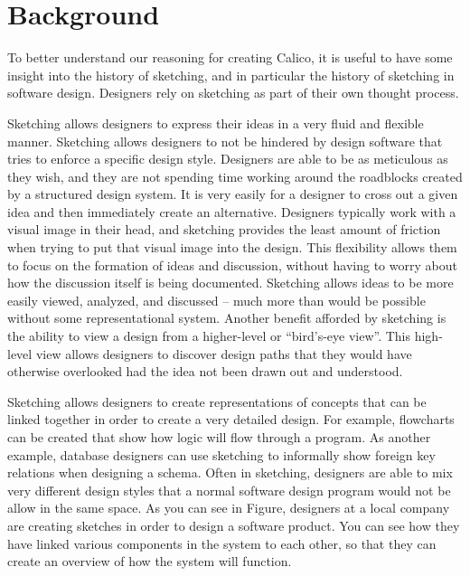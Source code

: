 \chapter{Background}

To better understand our reasoning for creating Calico, it is useful to have some insight into the history of sketching, and in particular the history of sketching in software design. Designers rely on sketching as part of their own thought process.

Sketching allows designers to express their ideas in a very fluid and flexible manner.
Sketching allows designers to not be hindered by design software that tries to enforce a specific design style. Designers are able to be as meticulous as they wish, and they are not spending time working around the roadblocks created by a structured design system.
It is very easily for a designer to cross out a given idea and then immediately create an alternative. Designers typically work with a visual image in their head\cite{todo}, and sketching provides the least amount of friction when trying to put that visual image into the design.
This flexibility allows them to focus on the formation of ideas and discussion, without having to worry about how the discussion itself is being documented. 
Sketching allows ideas to be more easily viewed, analyzed, and discussed -- much more than would be possible without some representational system.
Another benefit afforded by sketching is the ability to view a design from a higher-level or ``bird’s-eye view''.
This high-level view allows designers to discover design paths that they would have otherwise overlooked had the idea not been drawn out and understood. 

Sketching allows designers to create representations of concepts that can be linked together in order to create a very detailed design. For example, flowcharts can be created that show how logic will flow through a program. As another example, database designers can use sketching to informally show foreign key relations when designing a schema. Often in sketching, designers are able to mix very different design styles that a normal software design program would not be allow in the same space. As you can see in Figure, designers at a local company are creating sketches in order to design a software product. You can see how they have linked various components in the system to each other, so that they can create an overview of how the system will function.

